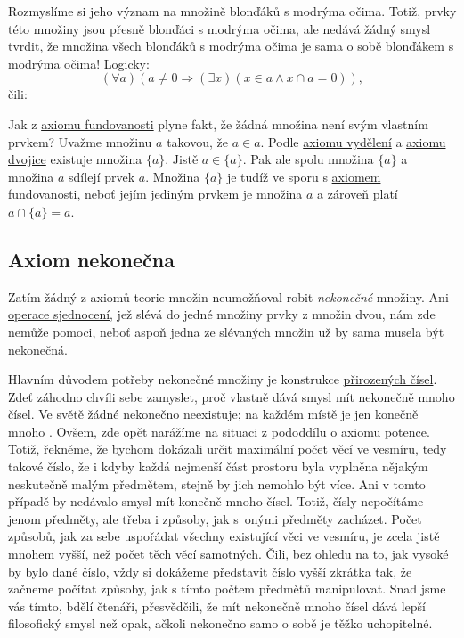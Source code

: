 Rozmyslíme si jeho význam na množině blonďáků s modrýma očima. Totiž, prvky této
množiny jsou přesně blonďáci s modrýma očima, ale nedává žádný smysl tvrdit, že
množina všech blonďáků s modrýma očima je sama o sobě blonďákem s modrýma očima!
Logicky:
\begin{equation}
  \label{eq:axiom-fundovanosti}
  ( \forall a)(a \neq 0 \Rightarrow ( \exists x)(x \in a \wedge x \cap a = 0)),
\end{equation}
čili: 

Jak z \hyperref[eq:axiom-fundovanosti]{axiomu fundovanosti} plyne fakt, že žádná
množina není svým vlastním prvkem? Uvažme množinu $a$ takovou, že $a \in a$.
Podle \hyperref[eq:axiom-vydeleni]{axiomu vydělení} a
\hyperref[eq:axiom-dvojice]{axiomu dvojice} existuje množina $\{a\}$. Jistě $a
\in \{a\}$. Pak ale spolu množina $\{a\}$ a množina $a$ sdílejí prvek $a$.
Množina $\{a\}$ je tudíž ve sporu s \hyperref[eq:axiom-fundovanosti]{axiomem
fundovanosti}, neboť jejím jediným prvkem je množina $a$ a zároveň platí $a \cap
\{a\} = a$.

\subsection{Axiom nekonečna}
\label{ssec:axiom-nekonecna}

Zatím žádný z axiomů teorie množin neumožňoval robit \emph{nekonečné} množiny.
Ani \hyperref[def:sjednoceni-mnozin]{operace sjednocení}, jež slévá do jedné
množiny prvky z množin dvou, nám zde nemůže pomoci, neboť aspoň jedna ze
slévaných množin už by sama musela být nekonečná.

Hlavním důvodem potřeby nekonečné množiny je konstrukce
\hyperref[chap:prirozena-cisla]{přirozených čísel}. Zdeť záhodno chvíli sebe
zamyslet, proč vlastně dává smysl mít nekonečně mnoho čísel. Ve světě žádné
 nekonečno neexistuje; na každém místě je jen konečně mnoho
. Ovšem, zde opět narážíme na situaci z
\hyperref[ssec:axiom-potence]{pododdílu o axiomu potence}. Totiž, řekněme, že
bychom dokázali určit maximální počet věcí ve vesmíru, tedy takové číslo, že i
kdyby každá nejmenší část prostoru byla vyplněna nějakým neskutečně malým
předmětem, stejně by jich nemohlo být více. Ani v tomto případě by nedávalo
smysl mít konečně mnoho čísel. Totiž, čísly nepočítáme jenom předměty, ale třeba
i způsoby, jak s~onými předměty zacházet. Počet způsobů, jak za sebe uspořádat
všechny existující věci ve vesmíru, je zcela jistě mnohem vyšší, než počet těch
věcí samotných. Čili, bez ohledu na to, jak vysoké by bylo dané 
číslo, vždy si dokážeme představit číslo vyšší zkrátka tak, že začneme počítat
způsoby, jak s tímto  počtem předmětů manipulovat. Snad jsme vás
tímto, bdělí čtenáři, přesvědčili, že mít nekonečně mnoho čísel dává lepší
filosofický smysl než opak, ačkoli nekonečno samo o sobě je těžko uchopitelné.

